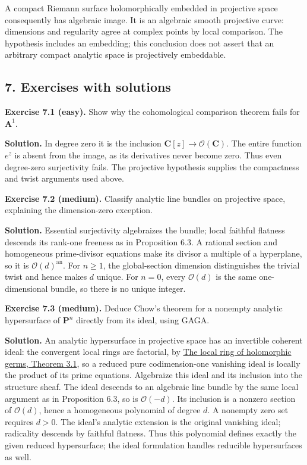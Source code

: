 \documentclass[11pt]{article}
\begin{document}
A compact Riemann surface holomorphically embedded in projective space
consequently has algebraic image. It is an algebraic smooth projective
curve: dimensions and regularity agree at complex points by local
comparison. The hypothesis includes an embedding; this conclusion does
not assert that an arbitrary compact analytic space is projectively
embeddable.

\subsection{7. Exercises with solutions}\label{exercises-with-solutions}

\textbf{Exercise 7.1 (easy).} Show why the cohomological comparison
theorem fails for \(\mathbf A^1\).

\textbf{Solution.} In degree zero it is the inclusion
\(\mathbf C[z]\to\mathcal O(\mathbf C)\). The entire function \(e^z\) is
absent from the image, as its derivatives never become zero. Thus even
degree-zero surjectivity fails. The projective hypothesis supplies the
compactness and twist arguments used above.

\textbf{Exercise 7.2 (medium).} Classify analytic line bundles on
projective space, explaining the dimension-zero exception.

\textbf{Solution.} Essential surjectivity algebraizes the bundle; local
faithful flatness descends its rank-one freeness as in Proposition 6.3.
A rational section and homogeneous prime-divisor equations make its
divisor a multiple of a hyperplane, so it is
\(\mathcal O(d)^{\mathrm{an}}\). For \(n\geq1\), the global-section
dimension distinguishes the trivial twist and hence makes \(d\) unique.
For \(n=0\), every \(\mathcal O(d)\) is the same one-dimensional bundle,
so there is no unique integer.

\textbf{Exercise 7.3 (medium).} Deduce Chow's theorem for a nonempty
analytic hypersurface of \(\mathbf P^n\) directly from its ideal, using
GAGA.

\textbf{Solution.} An analytic hypersurface in projective space has an
invertible coherent ideal: the convergent local rings are factorial, by
\href{../complex-analytic-spaces-and-coherent-sheaves/the-local-ring-of-holomorphic-germs.html\#3-unique-factorization}{The
local ring of holomorphic germs, Theorem 3.1}, so a reduced pure
codimension-one vanishing ideal is locally the product of its prime
equations. Algebraize this ideal and its inclusion into the structure
sheaf. The ideal descends to an algebraic line bundle by the same local
argument as in Proposition 6.3, so is \(\mathcal O(-d)\). Its inclusion
is a nonzero section of \(\mathcal O(d)\), hence a homogeneous
polynomial of degree \(d\). A nonempty zero set requires \(d>0\). The
ideal's analytic extension is the original vanishing ideal; radicality
descends by faithful flatness. Thus this polynomial defines exactly the
given reduced hypersurface; the ideal formulation handles reducible
hypersurfaces as well.
\end{document}
